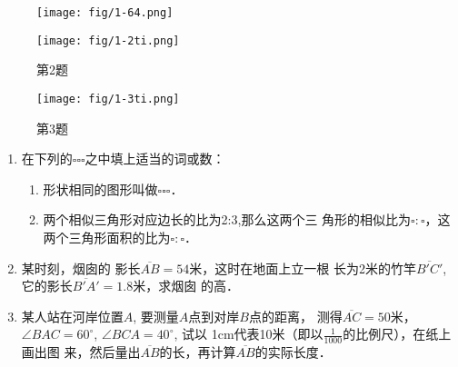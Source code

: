 \begin{figure}[htp]
	\centering
\texttt{[image: fig/1-64.png]}
	\caption{}
\end{figure}


\begin{figure}[htp]\centering
    \begin{minipage}[t]{0.48\textwidth}
    \centering
\texttt{[image: fig/1-2ti.png]}
    \caption*{第2题}
    \end{minipage}
    \begin{minipage}[t]{0.48\textwidth}
    \centering
\texttt{[image: fig/1-3ti.png]}
    \caption*{第3题}
    \end{minipage}
    \end{figure}

\begin{ex}
\begin{enumerate}
	\item 在下列的$\square \square \square $之中填上适当的词或数：
\begin{enumerate}
\item 形状相同的图形叫做$\square \square \square $．
\item 两个相似三角形对应边长的比为2:3,那么这两个三
	角形的相似比为$\square : \square $，这两个三角形面积的比为$\square : \square $．
\end{enumerate}

	\item 某时刻，烟囱的
	影长$\overline{AB}=54$米，这时在地面上立一根
	长为2米的竹竿$\overline{B'C'}$, 它的影长$\overline{B'A'}=1.8$米，求烟囱
	的高．
	\item 某人站在河岸位置$A$, 要测量$A$点到对岸$B$点的距离，
	测得$\overline{AC}=50$米，$\angle BAC=60^{\circ}$, $\angle BCA=40^{\circ}$, 试以
	1cm代表10米（即以$\frac{1}{1000}$的比例尺），在纸上画出图
	来，然后量出$\overline{AB}$的长，再计算$\overline{AB}$的实际长度．
\end{enumerate}
\end{ex}


